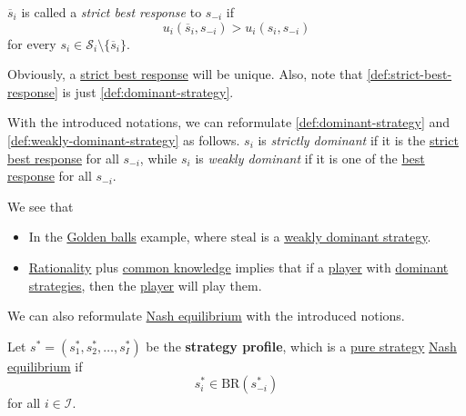 \begin{definition}\label{def:strict-best-response}
	\(\overline{s}_{i}\) is called a \emph{strict best response} to \(s_{-i}\) if
	\[
		u_{i}(\overline{s}_i, s_{-i})>u_{i}(s_{i}, s_{-i})
	\]
	for every \(s_{i}\in \mathcal{S}_{i}\setminus\{\overline{s}_i\} \).
\end{definition}

\begin{note}
	Obviously, a \hyperref[def:strict-best-response]{strict best response} will be unique. Also, note that \autoref{def:strict-best-response}
	is just \autoref{def:dominant-strategy}.
\end{note}

\begin{remark}
	With the introduced notations, we can reformulate \autoref{def:dominant-strategy} and \autoref{def:weakly-dominant-strategy} as follows.
	\(s_{i}\) is \emph{strictly dominant} if it is the \hyperref[def:strict-best-response]{strict best response} for all \(s_{-i}\), while
	\(s_{i}\) is \emph{weakly dominant} if it is one of the \hyperref[def:best-response]{best response} for all \(s_{-i}\).
\end{remark}

\begin{remark}
	We see that
	\begin{itemize}
		\item In the \hyperref[eg:golden-ball]{Golden balls} example, where \(\text{steal}\) is a \hyperref[def:weakly-dominant-strategy]{weakly dominant strategy}.
		\item \hyperref[rationality]{Rationality} plus \hyperref[common-knowledge]{common knowledge} implies that if a \hyperref[def:player]{player} with
		      \hyperref[def:dominant-strategy]{dominant strategies}, then the \hyperref[def:player]{player} will play them.
	\end{itemize}
\end{remark}

We can also reformulate \hyperref[def:Nash-equilibrium]{Nash equilibrium} with the introduced notions.

\begin{prev}
	Let \(s^{\ast} = (s_1^{\ast}, s_2^{\ast}, \ldots , s_I^{\ast})\) be the \textbf{strategy profile}, which is a \hyperref[def:pure-strategy]{pure strategy}
	\hyperref[def:Nash-equilibrium]{Nash equilibrium} if
	\[
		s_{i}^{\ast}\in\mathrm{BR}(s_{-i}^{\ast})
	\]
	for all \(i\in \mathcal{I} \).
\end{prev}

